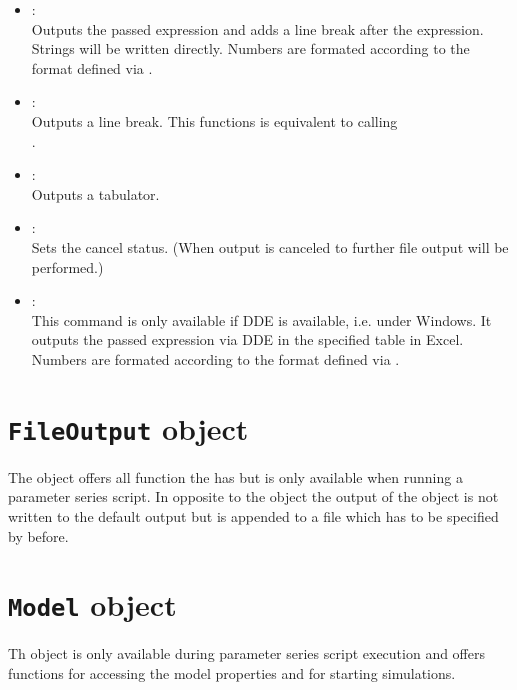\begin{itemize}
\item
{}:\\
Outputs the passed expression and adds a line break after the expression.
Strings will be written directly. Numbers are formated according to the format
defined via .

\item
{}:\\
Outputs a line break. This functions is equivalent to calling\\
.

\item
{}:\\
Outputs a tabulator.

\item
{}:\\
Sets the cancel status. (When output is canceled to further file output will be performed.)

\item
{}:\\
This command is only available if DDE is available, i.e. under Windows.
It outputs the passed expression via DDE in the specified table in Excel.
Numbers are formated according to the format defined via .

\end{itemize}



\chapter{\texttt{FileOutput} object}

The  object offers all function the  has
but is only available when running a parameter series script. In opposite
to the  object the output of the  object
is not written to the default output but is appended to a file which has
to be specified by  before.



\chapter{\texttt{Model} object}

Th  object is only available during parameter series
script execution and offers functions for accessing the model
properties and for starting simulations.


